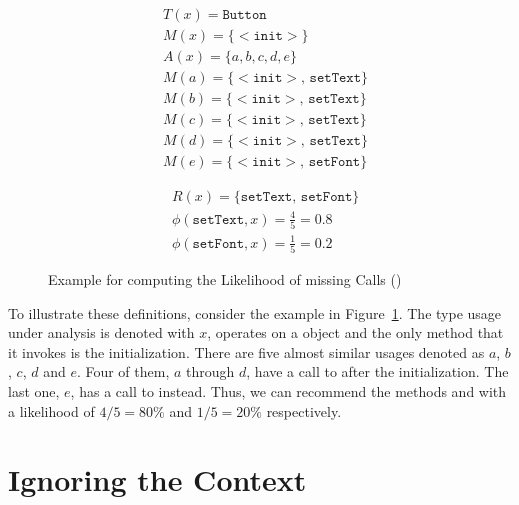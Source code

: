\begin{figure}[h]
    \begin{subfigure}[c]{0.45\textwidth}
        \begin{align*}
& T(x) = \mathtt{Button} \\
& M(x) = \{ \mathtt{<\!\!init\!\!>} \} \\
& A(x) = \{ a, b, c, d, e \} \\
& M(a) = \{ \mathtt{<\!\!init\!\!>},\, \mathtt{setText} \} \\
& M(b) = \{ \mathtt{<\!\!init\!\!>},\, \mathtt{setText} \} \\
& M(c) = \{ \mathtt{<\!\!init\!\!>},\, \mathtt{setText} \} \\
& M(d) = \{ \mathtt{<\!\!init\!\!>},\, \mathtt{setText} \} \\
& M(e) = \{ \mathtt{<\!\!init\!\!>},\, \mathtt{setFont} \}
        \end{align*}
    \end{subfigure}
    \begin{subfigure}[c]{0.45\textwidth}
        \begin{align*}
& R(x) = \{ \mathtt{setText},\, \mathtt{setFont} \} \\
& \phi(\mathtt{setText}, x) = \frac{4}{5} = 0.8 \\
& \phi(\mathtt{setFont}, x) = \frac{1}{5} = 0.2
        \end{align*}
    \end{subfigure}
    \caption{Example for computing the Likelihood of missing Calls (\cite{monperrus2013detecting})}\label{fig:missing_calls}
\end{figure}

To illustrate these definitions, consider the example in Figure~\ref{fig:missing_calls}.
The type usage under analysis is denoted with $x$, operates on a  object and the only method that it invokes is the initialization.
There are five almost similar usages denoted as $a$, $b$, $c$, $d$ and $e$.
Four of them, $a$ through $d$, have a call to  after the initialization.
The last one, $e$, has a call to  instead.
Thus, we can recommend the methods  and  with a likelihood of $4/5 = 80\%$ and $1/5 = 20\%$ respectively.

\section{Ignoring the Context}

